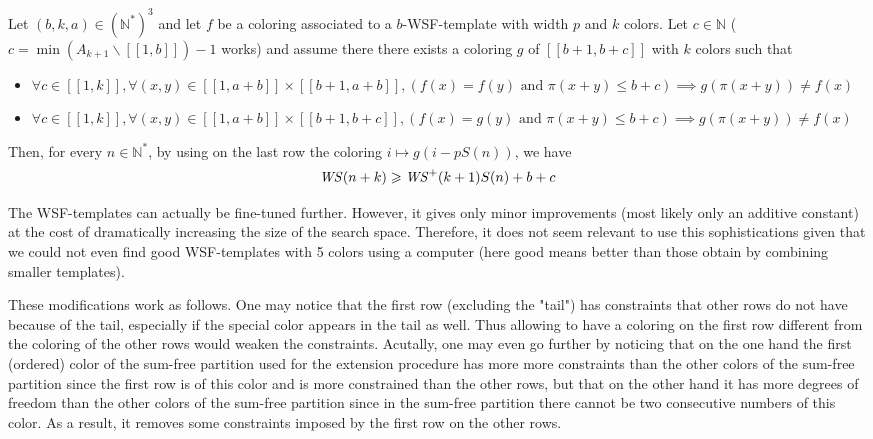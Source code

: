 \begin{proposition}
Let \((b, k, a) \in (\mathbb{N}^*)^3\) and let \(f\) be a coloring associated to a \(b\)-WSF-template with width \(p\) and \(k\) colors. Let
\(c \in \mathbb{N}\) (\(c = \min (A_{k+1} \backslash [\![1, b ]\!]) - 1\) works) and assume there there exists a coloring \(g\) of
\([\![b + 1, b + c]\!]\) with \(k\) colors such that

\begin{itemize}
	\item \(\forall c \in [\![1, k]\!], \forall (x, y) \in  [\![1, a + b]\!] \times  [\![b + 1, a + b]\!], (f(x) = f(y) \text{ and } \pi(x + y) \leqslant b + c)
	\implies g(\pi(x + y)) \neq f(x)\)
	\item \(\forall c \in [\![1, k]\!], \forall (x, y) \in  [\![1, a + b]\!] \times  [\![b + 1, b + c]\!],  (f(x) = g(y) \text{ and } \pi(x + y) \leqslant b + c)
\implies g(\pi(x + y)) \neq f(x)\)
\end{itemize}

Then, for every \(n \in \mathbb{N}^*\), by using on the last row the coloring \(i \longmapsto g(i - p S(n))\), we have\\
\[ \mathit{WS}(n+k) \geqslant \mathit{WS}^+(k+1) S(n) + b + c\]
\end{proposition}

The WSF-templates can actually be fine-tuned further. However, it gives only minor improvements (most likely only an additive
constant) at the cost of dramatically increasing the size of the search space. Therefore, it does not seem relevant to
use this sophistications given that we could not even find good WSF-templates with 5 colors using a computer (here good
means better than those obtain by combining smaller templates).

\par These modifications work as follows. One may notice that the first row (excluding the "tail") has constraints that other rows
do not have because of the tail, especially if the special color appears in the tail as well. Thus allowing to have a coloring on the
first row different from the coloring of the other rows would weaken the constraints. Acutally, one may even go further by
noticing that on the one hand the first (ordered) color of the sum-free partition used for the extension procedure has more
more constraints than the other colors of the sum-free partition since the first row is of this color and is more constrained than
the other rows, but that on the other hand it has more degrees of freedom than the other colors of the sum-free partition since in
the sum-free partition there cannot be two consecutive numbers of this color. As a result, it removes  some constraints imposed
 by the first row on the other rows.

